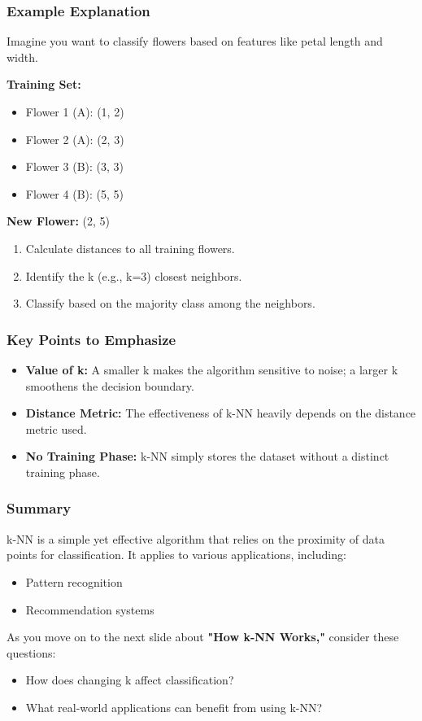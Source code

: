 \documentclass[aspectratio=169]{beamer}
\begin{document}
\begin{frame}[fragile]
    \frametitle{Example Explanation}
    Imagine you want to classify flowers based on features like petal length and width.

    \textbf{Training Set:}
    \begin{itemize}
        \item Flower 1 (A): (1, 2)
        \item Flower 2 (A): (2, 3)
        \item Flower 3 (B): (3, 3)
        \item Flower 4 (B): (5, 5)
    \end{itemize}

    \textbf{New Flower:} (2, 5)
    \begin{enumerate}
        \item Calculate distances to all training flowers.
        \item Identify the k (e.g., k=3) closest neighbors.
        \item Classify based on the majority class among the neighbors.
    \end{enumerate}
\end{frame}

\begin{frame}[fragile]
    \frametitle{Key Points to Emphasize}
    \begin{itemize}
        \item \textbf{Value of k:} A smaller k makes the algorithm sensitive to noise; a larger k smoothens the decision boundary.
        \item \textbf{Distance Metric:} The effectiveness of k-NN heavily depends on the distance metric used.
        \item \textbf{No Training Phase:} k-NN simply stores the dataset without a distinct training phase.
    \end{itemize}
\end{frame}

\begin{frame}[fragile]
    \frametitle{Summary}
    k-NN is a simple yet effective algorithm that relies on the proximity of data points for classification. It applies to various applications, including:
    \begin{itemize}
        \item Pattern recognition
        \item Recommendation systems
    \end{itemize}
    \newline
    As you move on to the next slide about \textbf{"How k-NN Works,"} consider these questions:
    \begin{itemize}
        \item How does changing k affect classification?
        \item What real-world applications can benefit from using k-NN?
    \end{itemize}
\end{frame}
\end{document}
